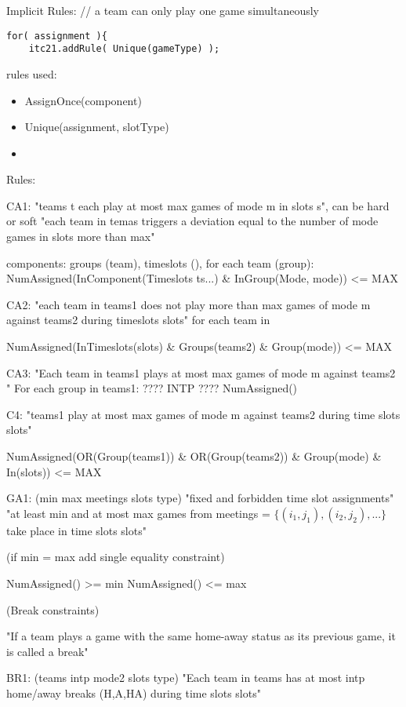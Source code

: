 Implicit Rules:
// a team can only play one game simultaneously
\begin{verbatim}
for( assignment ){
	itc21.addRule( Unique(gameType) );
\end{verbatim}


rules used:
\begin{itemize}
	\item AssignOnce(component)
	\item Unique(assignment, slotType)
	\item 
\end{itemize}








Rules:

CA1: "teams t each play at most max games of mode m in slots s", can be hard or soft
"each team in temas triggers a deviation equal to the number of mode games in slots more than max"

components: groups (team), timeslots (),
for each team (group):
NumAssigned(InComponent(Timeslots ts...) \& InGroup(Mode, mode)) <= MAX

CA2: "each team in teams1 does not play more than max games of mode m against teams2 during timeslots slots"
for each team in 

NumAssigned(InTimeslots(slots) \& Groups(teams2) \& Group(mode)) <= MAX

CA3: "Each team in teams1 plays at most max games of mode m against teams2 "
For each group in teams1:
???? INTP ????
NumAssigned()

C4: "teams1 play at most max games of mode m against teams2 during time slots slots"

NumAssigned(OR(Group(teams1)) \& OR(Group(teams2)) \& Group(mode) \& In(slots)) <= MAX

GA1: (min max meetings slots type) "fixed and forbidden time slot assignments" "at least min and at most max games from meetings = $\{(i_1,j_1),(i_2,j_2),...\}$ take place in time slots slots"

(if min = max add single equality constraint)

NumAssigned() >= min
NumAssigned() <= max

(Break constraints)

"If a team plays a game with the same home-away status as its previous game, it is called a break"

BR1: (teams intp mode2 slots type)
"Each team in teams has at most intp home/away breaks (H,A,HA) during time slots slots" 

